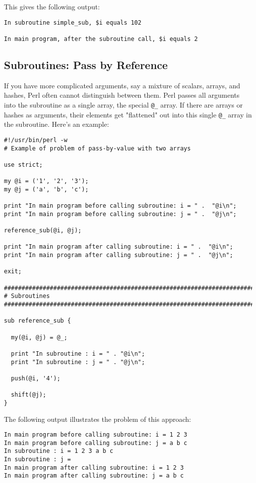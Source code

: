 This gives the following output:

\begin{lstlisting}
In subroutine simple_sub, $i equals 102

In main program, after the subroutine call, $i equals 2
\end{lstlisting}

\subsection{Subroutines: Pass by Reference}
If you have more complicated arguments, say a mixture of scalars, arrays, and hashes, Perl often cannot distinguish between them. Perl passes all arguments into the subroutine as a single array, the special \verb|@_| array. If there are arrays or hashes as arguments, their elements get "flattened" out into this single \verb|@_| array in the subroutine. Here's an example: 

\begin{lstlisting}
#!/usr/bin/perl -w
# Example of problem of pass-by-value with two arrays

use strict;

my @i = ('1', '2', '3');
my @j = ('a', 'b', 'c');

print "In main program before calling subroutine: i = " .  "@i\n";
print "In main program before calling subroutine: j = " .  "@j\n";

reference_sub(@i, @j);

print "In main program after calling subroutine: i = " .  "@i\n";
print "In main program after calling subroutine: j = " .  "@j\n";

exit;

################################################################################
# Subroutines
################################################################################

sub reference_sub {

  my(@i, @j) = @_;

  print "In subroutine : i = " . "@i\n";
  print "In subroutine : j = " . "@j\n";

  push(@i, '4');

  shift(@j);
}
\end{lstlisting}

The following output illustrates the problem of this approach:

\begin{lstlisting}
In main program before calling subroutine: i = 1 2 3
In main program before calling subroutine: j = a b c
In subroutine : i = 1 2 3 a b c
In subroutine : j = 
In main program after calling subroutine: i = 1 2 3
In main program after calling subroutine: j = a b c
\end{lstlisting}


